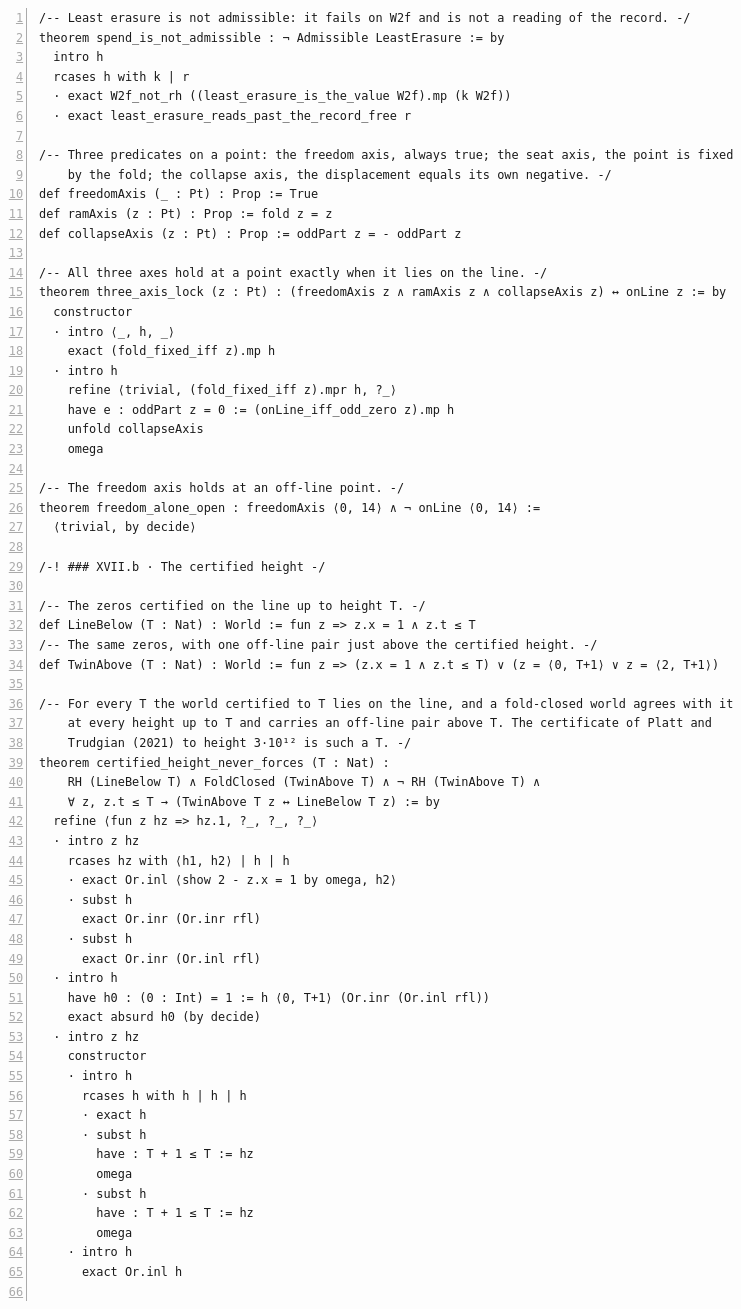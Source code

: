 \documentclass[10pt]{article}
\newcommand{\leansize}{\fontsize{5.5pt}{6.75pt}\selectfont}
\begin{document}
\begin{multicols}{2}
\begin{Verbatim}[numbers=left,firstnumber=1,numbersep=3pt,xleftmargin=2.6em,breaklines=true,breakanywhere=true,breakautoindent=false,breakindent=1.4em,breaksymbolleft={},breakanywheresymbolpre={},fontsize=\leansize]
/-- Least erasure is not admissible: it fails on W2f and is not a reading of the record. -/
theorem spend_is_not_admissible : ¬ Admissible LeastErasure := by
  intro h
  rcases h with k | r
  · exact W2f_not_rh ((least_erasure_is_the_value W2f).mp (k W2f))
  · exact least_erasure_reads_past_the_record_free r

/-- Three predicates on a point: the freedom axis, always true; the seat axis, the point is fixed
    by the fold; the collapse axis, the displacement equals its own negative. -/
def freedomAxis (_ : Pt) : Prop := True
def ramAxis (z : Pt) : Prop := fold z = z
def collapseAxis (z : Pt) : Prop := oddPart z = - oddPart z

/-- All three axes hold at a point exactly when it lies on the line. -/
theorem three_axis_lock (z : Pt) : (freedomAxis z ∧ ramAxis z ∧ collapseAxis z) ↔ onLine z := by
  constructor
  · intro ⟨_, h, _⟩
    exact (fold_fixed_iff z).mp h
  · intro h
    refine ⟨trivial, (fold_fixed_iff z).mpr h, ?_⟩
    have e : oddPart z = 0 := (onLine_iff_odd_zero z).mp h
    unfold collapseAxis
    omega

/-- The freedom axis holds at an off-line point. -/
theorem freedom_alone_open : freedomAxis ⟨0, 14⟩ ∧ ¬ onLine ⟨0, 14⟩ :=
  ⟨trivial, by decide⟩

/-! ### XVII.b · The certified height -/

/-- The zeros certified on the line up to height T. -/
def LineBelow (T : Nat) : World := fun z => z.x = 1 ∧ z.t ≤ T
/-- The same zeros, with one off-line pair just above the certified height. -/
def TwinAbove (T : Nat) : World := fun z => (z.x = 1 ∧ z.t ≤ T) ∨ (z = ⟨0, T+1⟩ ∨ z = ⟨2, T+1⟩)

/-- For every T the world certified to T lies on the line, and a fold-closed world agrees with it
    at every height up to T and carries an off-line pair above T. The certificate of Platt and
    Trudgian (2021) to height 3·10¹² is such a T. -/
theorem certified_height_never_forces (T : Nat) :
    RH (LineBelow T) ∧ FoldClosed (TwinAbove T) ∧ ¬ RH (TwinAbove T) ∧
    ∀ z, z.t ≤ T → (TwinAbove T z ↔ LineBelow T z) := by
  refine ⟨fun z hz => hz.1, ?_, ?_, ?_⟩
  · intro z hz
    rcases hz with ⟨h1, h2⟩ | h | h
    · exact Or.inl ⟨show 2 - z.x = 1 by omega, h2⟩
    · subst h
      exact Or.inr (Or.inr rfl)
    · subst h
      exact Or.inr (Or.inl rfl)
  · intro h
    have h0 : (0 : Int) = 1 := h ⟨0, T+1⟩ (Or.inr (Or.inl rfl))
    exact absurd h0 (by decide)
  · intro z hz
    constructor
    · intro h
      rcases h with h | h | h
      · exact h
      · subst h
        have : T + 1 ≤ T := hz
        omega
      · subst h
        have : T + 1 ≤ T := hz
        omega
    · intro h
      exact Or.inl h


\end{Verbatim}
\end{multicols}
\end{document}
